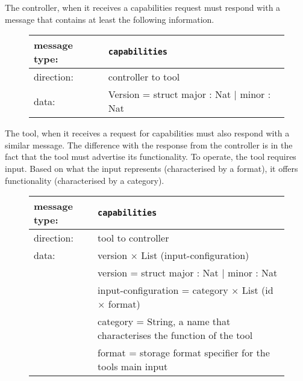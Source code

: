 \documentclass{article}
\newcommand{\msg}[1]{\texttt{#1}}
\begin{document}
   The controller, when it receives a capabilities request must respond with a
   message that contains at least the following information.

   \begin{figure}[H]
    \begin{center}
     \begin{tabular}{|ll|}
      \hline
       message type:   & \msg{capabilities} \\
      \hline
       direction:      & controller to tool \\
       data:           & Version = struct major : Nat $|$ minor : Nat \\
      \hline
     \end{tabular}
    \end{center}
   \end{figure}

   The tool, when it receives a request for capabilities must also respond with
   a similar message. The difference with the response from the controller is
   in the fact that the tool must advertise its functionality. To operate, the
   tool requires input. Based on what the input represents (characterised by a
   format), it offers functionality (characterised by a category).
   
   \begin{figure}[H]
    \begin{center}
     \begin{tabular}{|ll|}
      \hline
       message type:   & \msg{capabilities} \\
      \hline
       direction:      & tool to controller \\
       data:           & version $\times$ List (input-configuration) \\
                       &  version             = struct major : Nat $|$ minor : Nat \\
                       &  input-configuration = category $\times$ List (id $\times$ format) \\
                       &  category            = String,   a name that characterises the function of the tool \\
                       &  format              = storage format specifier for the tools main input \\
      \hline
     \end{tabular}
    \end{center}
   \end{figure}
\end{document}
